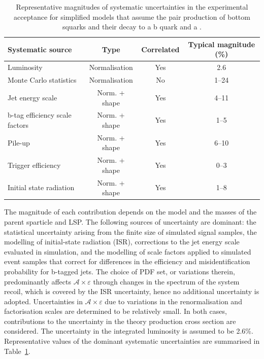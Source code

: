 \begin{table}[h!]
  \caption{
    Representative magnitudes of systematic uncertainties in the
    experimental acceptance for simplified models that assume the 
    pair production of bottom squarks and their decay to a b
    quark and a \chiz.}  
  \label{tab:signal_systs}
  \centering
  \footnotesize
  \begin{tabular}{ lccc }
    \hline
    Systematic source\T\B          & Type          & Correlated & Typical magnitude (\%) \\
    \hline
    Luminosity\T                   & Normalisation & Yes        & 2.6                    \\
    Monte Carlo statistics         & Normalisation & No         & 1--24                  \\
    Jet energy scale               & Norm. + shape & Yes        & 4--11                  \\
    b-tag efficiency scale factors & Norm. + shape & Yes        & 1--5                   \\
    Pile-up                        & Norm. + shape & Yes        & 6--10                  \\
    Trigger efficiency             & Norm. + shape & Yes        & 0--3                   \\
    Initial state radiation        & Norm. + shape & Yes        & 1--8                   \\
    \hline
  \end{tabular}
\end{table}

The magnitude of each contribution depends on the model and the masses
of the parent sparticle and LSP. The following sources of uncertainty
are dominant: the statistical uncertainty arising from the finite size
of simulated signal samples, the modelling of initial-state radiation
(ISR), corrections to the jet energy scale evaluated in simulation,
and the modelling of scale factors applied to simulated event samples
that correct for differences in the efficiency and misidentification
probability for b-tagged jets. The choice of PDF set, or variations
therein, predominantly affects $\mathcal{A}\times\varepsilon$ through
changes in the \Pt spectrum of the system recoil, which is covered by
the ISR uncertainty, hence no additional uncertainty is
adopted. Uncertainties in $\mathcal{A}\times\varepsilon$ due to
variations in the renormalisation and factorisation scales are
determined to be relatively small. In both cases, contributions to the
uncertainty in the theory production cross section are considered. The
uncertainty in the integrated luminosity is assumed to be
2.6\%. Representative values of the dominant systematic uncertainties
are summarised in Table~\ref{tab:signal_systs}.

